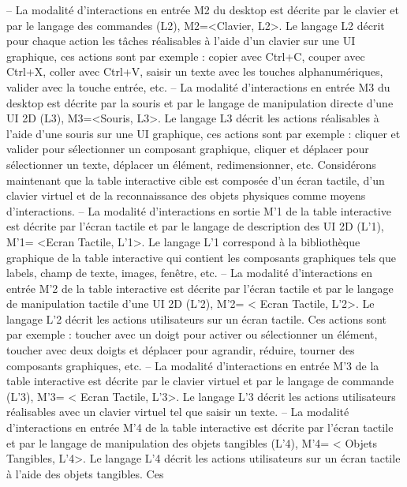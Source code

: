 \documentclass{article}
\begin{document}
– La modalit\'{e} d’interactions en entr\'{e}e M2 du desktop est d\'{e}crite par le clavier et par le langage
des commandes (L2), M2=<Clavier, L2>. Le langage L2 d\'{e}crit pour chaque action les t\^{a}ches
r\'{e}alisables \`{a} l’aide d’un clavier sur une UI graphique, ces actions sont par exemple : copier
avec Ctrl+C, couper avec Ctrl+X, coller avec Ctrl+V, saisir un texte avec les touches alphanum\'{e}riques, valider avec la touche entr\'{e}e, etc.
– La modalit\'{e} d’interactions en entr\'{e}e M3 du desktop est d\'{e}crite par la souris et par le langage
de manipulation directe d’une UI 2D (L3), M3=<Souris, L3>. Le langage L3 d\'{e}crit les actions
r\'{e}alisables \`{a} l’aide d’une souris sur une UI graphique, ces actions sont par exemple : cliquer
et valider pour s\'{e}lectionner un composant graphique, cliquer et d\'{e}placer pour s\'{e}lectionner un
texte, d\'{e}placer un \'{e}l\'{e}ment, redimensionner, etc.
Consid\'{e}rons maintenant que la table interactive cible est compos\'{e}e d’un \'{e}cran tactile, d’un clavier
virtuel et de la reconnaissance des objets physiques comme moyens d’interactions.
– La modalit\'{e} d’interactions en sortie M’1 de la table interactive est d\'{e}crite par l’\'{e}cran tactile
et par le langage de description des UI 2D (L’1), M’1= <Ecran Tactile, L’1>. Le langage L’1
correspond \`{a} la biblioth\`{e}que graphique de la table interactive qui contient les composants graphiques tels que labels, champ de texte, images, fen\^{e}tre, etc.
– La modalit\'{e} d’interactions en entr\'{e}e M’2 de la table interactive est d\'{e}crite par l’\'{e}cran tactile
et par le langage de manipulation tactile d’une UI 2D (L’2), M’2= < Ecran Tactile, L’2>. Le
langage L’2 d\'{e}crit les actions utilisateurs sur un \'{e}cran tactile. Ces actions sont par exemple :
toucher avec un doigt pour activer ou s\'{e}lectionner un \'{e}l\'{e}ment, toucher avec deux doigts et
d\'{e}placer pour agrandir, r\'{e}duire, tourner des composants graphiques, etc.
– La modalit\'{e} d’interactions en entr\'{e}e M’3 de la table interactive est d\'{e}crite par le clavier virtuel
et par le langage de commande (L’3), M’3= < Ecran Tactile, L’3>. Le langage L’3 d\'{e}crit les
actions utilisateurs r\'{e}alisables avec un clavier virtuel tel que saisir un texte.
– La modalit\'{e} d’interactions en entr\'{e}e M’4 de la table interactive est d\'{e}crite par l’\'{e}cran tactile et
par le langage de manipulation des objets tangibles (L’4), M’4= < Objets Tangibles, L’4>. Le
langage L’4 d\'{e}crit les actions utilisateurs sur un \'{e}cran tactile \`{a} l’aide des objets tangibles. Ces
\end{document}
